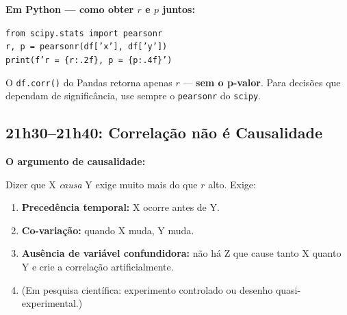 \begin{NoteBox}
\textbf{Em Python — como obter $r$ e $p$ juntos:}

\texttt{from scipy.stats import pearsonr}\\
\texttt{r, p = pearsonr(df['x'], df['y'])}\\
\texttt{print(f'r = \{r:.2f\}, p = \{p:.4f\}')}

O \texttt{df.corr()} do Pandas retorna apenas $r$ — \textbf{sem o p-valor}.
Para decisões que dependam de significância, use sempre o \texttt{pearsonr}
do \texttt{scipy}.
\end{NoteBox}

\subsection{21h30–21h40: Correlação não é Causalidade}

\begin{SolvedBox}
\textbf{O argumento de causalidade:}

Dizer que X \emph{causa} Y exige muito mais do que $r$ alto. Exige:
\begin{enumerate}
  \item \textbf{Precedência temporal:} X ocorre antes de Y.
  \item \textbf{Co-variação:} quando X muda, Y muda.
  \item \textbf{Ausência de variável confundidora:} não há Z que cause tanto X quanto Y
  e crie a correlação artificialmente.
  \item (Em pesquisa científica: experimento controlado ou desenho quasi-experimental.)
\end{enumerate}
\end{SolvedBox}

